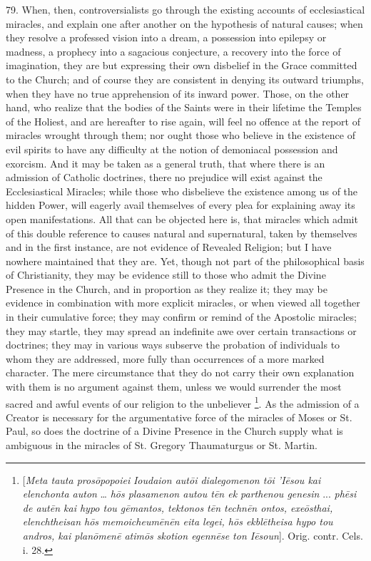 79.
When, then, controversialists go through the existing accounts of
ecclesiastical miracles, and explain one after another on the
hypothesis of natural causes; when they resolve a professed vision
into a dream, a possession into epilepsy or madness, a prophecy into a
sagacious conjecture, a recovery into the force of imagination, they
are but expressing their own disbelief in the Grace committed to the
Church; and of course they are consistent in denying its outward
triumphs, when they have no true apprehension of its inward power.
Those, on the other hand, who realize that the bodies of the Saints
were in their lifetime the Temples of the Holiest, and are hereafter
to rise again, will feel no offence at the report of miracles wrought
through them; nor ought those who believe in the existence of evil
spirits to have any difficulty at the notion of demoniacal possession
and exorcism. And it may be taken as a general truth, that where there
is an admission of Catholic doctrines, there no prejudice will exist
against the Ecclesiastical Miracles; while those who disbelieve the
existence among us of the hidden Power, will eagerly avail themselves
of every plea for explaining away its open manifestations. All that
can be objected here is, that miracles which admit of this double
reference to causes natural and supernatural, taken by
themselves and in the first instance, are not evidence of Revealed
Religion; but I have nowhere maintained that they are. Yet, though not
part of the philosophical basis of Christianity, they may be evidence
still to those who admit the Divine Presence in the Church, and in
proportion as they realize it; they may be evidence in combination
with more explicit miracles, or when viewed all together in their
cumulative force; they may confirm or remind of the Apostolic
miracles; they may startle, they may spread an indefinite awe over
certain transactions or doctrines; they may in various ways subserve
the probation of individuals to whom they are addressed, more fully
than occurrences of a more marked character. The mere circumstance
that they do not carry their own explanation with them is no argument
against them, unless we would surrender the most sacred and awful
events of our religion to the unbeliever \footnote{[\emph{Meta tauta pros\={o}popoiei} \emph{Ioudaion aut\={o}i dialegomenon
t\={o}i 'I\={e}sou kai elenchonta auton} … \emph{h\={o}s
plasamenon autou t\={e}n ek parthenou genesin} ... \emph{ph\={e}si
de aut\={e}n kai hypo tou g\={e}mantos, tektonos t\={e}n
techn\={e}n ontos, exe\={o}sthai, elenchtheisan h\={o}s
memoicheum\={e}n\={e}n eita legei, h\={o}s ekbl\={e}theisa
hypo
tou andros, kai plan\={o}men\={e} atim\={o}s skotion egenn\={e}se
ton I\={e}soun}]. Orig. contr. Cels. i. 28.}. As the admission of a Creator is necessary for the
argumentative force of the miracles of Moses or St. Paul, so does the
doctrine of a Divine Presence in the Church supply what is ambiguous
in the miracles of St. Gregory Thaumaturgus or St. Martin.

